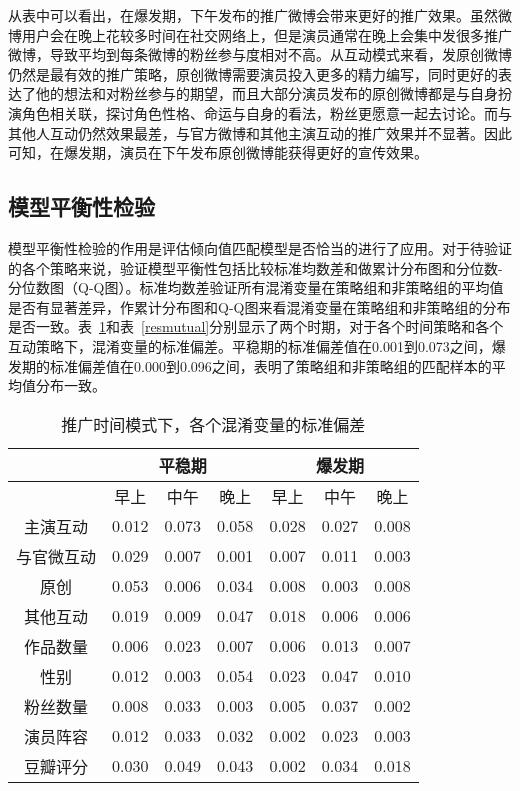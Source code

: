 从表中可以看出，在爆发期，下午发布的推广微博会带来更好的推广效果。虽然微博用户会在晚上花较多时间在社交网络上，但是演员通常在晚上会集中发很多推广微博，导致平均到每条微博的粉丝参与度相对不高。从互动模式来看，发原创微博仍然是最有效的推广策略，原创微博需要演员投入更多的精力编写，同时更好的表达了他的想法和对粉丝参与的期望，而且大部分演员发布的原创微博都是与自身扮演角色相关联，探讨角色性格、命运与自身的看法，粉丝更愿意一起去讨论。而与其他人互动仍然效果最差，与官方微博和其他主演互动的推广效果并不显著。因此可知，在爆发期，演员在下午发布原创微博能获得更好的宣传效果。

\subsection{模型平衡性检验}

模型平衡性检验的作用是评估倾向值匹配模型是否恰当的进行了应用。对于待验证的各个策略来说，验证模型平衡性包括比较标准均数差和做累计分布图和分位数-分位数图（Q-Q图）。标准均数差验证所有混淆变量在策略组和非策略组的平均值是否有显著差异，作累计分布图和Q-Q图来看混淆变量在策略组和非策略组的分布是否一致。表~\ref{res3}和表~\ref{resmutual}分别显示了两个时期，对于各个时间策略和各个互动策略下，混淆变量的标准偏差。平稳期的标准偏差值在0.001到0.073之间，爆发期的标准偏差值在0.000到0.096之间，表明了策略组和非策略组的匹配样本的平均值分布一致。

\begin{table}[!htbp]
\centering
\caption{推广时间模式下，各个混淆变量的标准偏差}
\label{res3}
\begin{tabular}{|c|c|c|c|c|c|c|} \hline
&\multicolumn{3}{c|}{平稳期}& \multicolumn{3}{c|}{爆发期}\\ \hline
&早上&中午& 晚上 &早上&中午& 晚上\\ \hline
主演互动&0.012&0.073& 0.058&0.028&0.027& 0.008\\ \hline
与官微互动&0.029&0.007& 0.001&0.007&0.011& 0.003 \\ \hline
原创&0.053&0.006& 0.034&0.008&0.003& 0.008\\ \hline
其他互动&0.019&0.009& 0.047&0.018&0.006& 0.006\\ \hline
作品数量&0.006&0.023& 0.007&0.006&0.013& 0.007\\ \hline
性别&0.012&0.003& 0.054&0.023&0.047& 0.010\\ \hline
粉丝数量&0.008&0.033& 0.003&0.005&0.037& 0.002\\ \hline
演员阵容&0.012&0.033& 0.032&0.002&0.023& 0.003\\ \hline
豆瓣评分&0.030&0.049& 0.043&0.002&0.034&0.018\\ \hline
\end{tabular}
\end{table}

